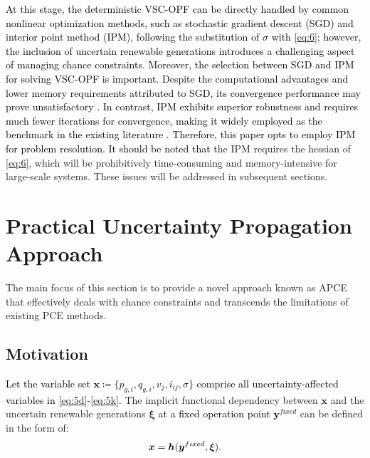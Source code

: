 \documentclass[journal]{IEEEtran}
\theoremstyle{definition}
\theoremstyle{remark}
\begin{document}
\textcolor{black}{At this stage, the deterministic VSC-OPF can be directly handled by common nonlinear optimization methods, such as stochastic gradient descent (SGD) and interior point method (IPM), following the substitution of $\sigma$ with \eqref{eq:6}; however, the inclusion of uncertain renewable generations introduces a challenging aspect of managing chance constraints. Moreover, the selection between SGD and IPM for solving VSC-OPF is important. Despite the computational advantages and lower memory requirements attributed to SGD, its convergence performance may prove unsatisfactory \cite{10.5555/2969442.2969497}. In contrast, IPM exhibits superior robustness and requires much fewer iterations for convergence, making it widely employed as the benchmark in the existing literature \cite{venzke2020inexact,liu2019acopf,mhanna2018adaptive}. Therefore, this paper opts to employ IPM for problem resolution. It should be noted that} the IPM requires the hessian of \eqref{eq:6}, which will be prohibitively time-consuming and memory-intensive for large-scale systems. These issues will be addressed in subsequent sections.
\section{Practical Uncertainty Propagation Approach}\label{approach}
The main focus of this section is to provide a novel approach known as APCE that effectively deals with chance constraints and transcends the limitations of existing PCE methods.   
\subsection{Motivation}
\textcolor{black}{Let the variable set $\boldsymbol{x}\coloneqq\{p_{g,i},q_{g, i},v_j,i_{ij},\sigma\}$ comprise all uncertainty-affected variables in \eqref{eq:5d}-\eqref{eq:5k}.} The implicit functional dependency between $\boldsymbol{x}$ and the uncertain renewable generations $\boldsymbol{\xi}$ \textcolor{black}{at a fixed operation point $\boldsymbol{y}^{fixed}$} can be defined in the form of:
\begin{equation}
    \textcolor{black}{\boldsymbol{x}=\boldsymbol{h}(\boldsymbol{y}^{fixed},\boldsymbol{\xi})}.
\end{equation}
\end{document}
